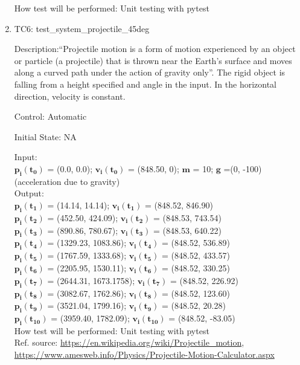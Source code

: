 \documentclass[12pt, titlepage]{article}
\begin{document}
\begin{enumerate}
How test will be performed: Unit testing with pytest

\item{TC6: test\_system\_projectile\_45deg\\}

Description:``Projectile motion is a form of motion experienced by an object or particle (a projectile) that is thrown near the Earth's surface and moves along a curved path under the action of gravity only''. The rigid object is falling from a height specified and angle in the input. In the horizontal direction, velocity is constant.

Control: Automatic

Initial State: NA

Input:\\
$\mathbf{p_i}$$\mathbf{(t_0)}$ = (0.0, 0.0); $\mathbf{v_i}$$\mathbf{(t_0)}$ = (848.50, 0); $\mathbf{m}$ = 10; $\mathbf{g}$ =(0, -100)(acceleration due to gravity) \\

Output:\\
$\mathbf{p_i}$$\mathbf{(t_1)}$ = (14.14, 14.14);
$\mathbf{v_i}$$\mathbf{(t_1)}$ = (848.52, 846.90)\\
$\mathbf{p_i}$$\mathbf{(t_2)}$ = (452.50, 424.09);
$\mathbf{v_i}$$\mathbf{(t_2)}$ = (848.53, 743.54)\\
$\mathbf{p_i}$$\mathbf{(t_3)}$ = (890.86, 780.67);
$\mathbf{v_i}$$\mathbf{(t_3)}$ = (848.53, 640.22)\\
$\mathbf{p_i}$$\mathbf{(t_4)}$ = (1329.23, 1083.86);
$\mathbf{v_i}$$\mathbf{(t_4)}$ = (848.52, 536.89)\\ 
$\mathbf{p_i}$$\mathbf{(t_5)}$ = (1767.59, 1333.68);
$\mathbf{v_i}$$\mathbf{(t_5)}$ = (848.52, 433.57)\\ 
$\mathbf{p_i}$$\mathbf{(t_6)}$ = (2205.95, 1530.11);
$\mathbf{v_i}$$\mathbf{(t_6)}$ = (848.52, 330.25)\\ 
$\mathbf{p_i}$$\mathbf{(t_7)}$ = (2644.31, 1673.1758);
$\mathbf{v_i}$$\mathbf{(t_7)}$ = (848.52, 226.92)\\ 
$\mathbf{p_i}$$\mathbf{(t_8)}$ = (3082.67, 1762.86);
$\mathbf{v_i}$$\mathbf{(t_8)}$ = (848.52, 123.60)\\
$\mathbf{p_i}$$\mathbf{(t_9)}$ = (3521.04, 1799.16);
$\mathbf{v_i}$$\mathbf{(t_9)}$ = (848.52, 20.28)\\ 
$\mathbf{p_i}$$\mathbf{(t_10)}$ = (3959.40, 1782.09);
$\mathbf{v_i}$$\mathbf{(t_10)}$ = (848.52, -83.05)\\   

How test will be performed: Unit testing with pytest\\
Ref. source:  \url{https://en.wikipedia.org/wiki/Projectile_motion},
\url{https://www.amesweb.info/Physics/Projectile-Motion-Calculator.aspx}


\end{enumerate}
\end{document}
